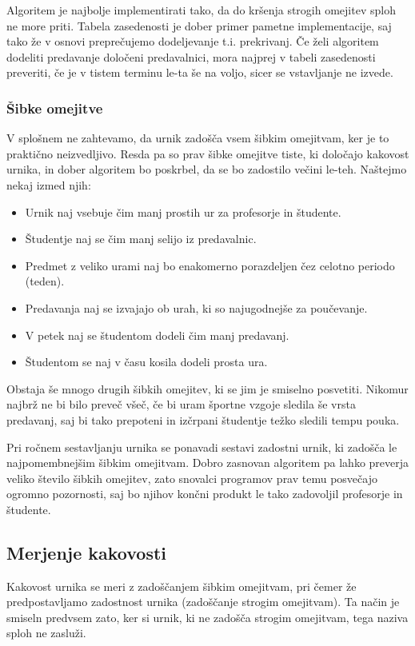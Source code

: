 \documentclass[a4paper,10pt]{article}
\begin{document}
Algoritem je najbolje implementirati tako, da do kršenja strogih omejitev sploh ne more priti. Tabela zasedenosti je dober primer pametne implementacije, saj tako že v osnovi preprečujemo dodeljevanje t.i. prekrivanj. Če želi algoritem dodeliti predavanje določeni predavalnici, mora najprej v tabeli zasedenosti preveriti, če je v tistem terminu le-ta še na voljo, sicer se vstavljanje ne izvede.
\subsubsection{Šibke omejitve}
V splošnem ne zahtevamo, da urnik zadošča vsem šibkim omejitvam, ker je to praktično neizvedljivo. Resda pa so prav šibke omejitve tiste, ki določajo kakovost urnika, in dober algoritem bo poskrbel, da se bo zadostilo večini le-teh. Naštejmo nekaj izmed njih:

\begin{itemize}
    \item Urnik naj vsebuje čim manj prostih ur za profesorje in študente.
    \item Študentje naj se čim manj selijo iz predavalnic.
    \item Predmet z veliko urami naj bo enakomerno porazdeljen čez celotno periodo (teden).
    \item Predavanja naj se izvajajo ob urah, ki so najugodnejše za poučevanje.
    \item V petek naj se študentom dodeli čim manj predavanj.
    \item Študentom se naj v času kosila dodeli prosta ura.
\end{itemize}

Obstaja še mnogo drugih šibkih omejitev, ki se jim je smiselno posvetiti. Nikomur najbrž ne bi bilo preveč všeč, če bi uram športne vzgoje sledila še vrsta predavanj, saj bi tako prepoteni in izčrpani študentje težko sledili tempu pouka.

Pri ročnem sestavljanju urnika se ponavadi sestavi zadostni urnik, ki zadošča le najpomembnejšim šibkim omejitvam. Dobro zasnovan algoritem pa lahko preverja veliko število šibkih omejitev, zato snovalci programov prav temu posvečajo ogromno pozornosti, saj bo njihov končni produkt le tako zadovoljil profesorje in študente.
\subsection{Merjenje kakovosti}
Kakovost urnika se meri z zadoščanjem šibkim omejitvam, pri čemer že predpostavljamo zadostnost urnika (zadoščanje strogim omejitvam). Ta način je smiseln predvsem zato, ker si urnik, ki ne zadošča strogim omejitvam, tega naziva sploh ne zasluži.
\end{document}
